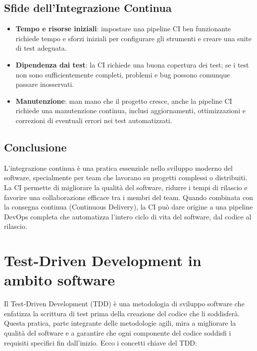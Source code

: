 \documentclass{article}
\begin{document}
\subsection*{Sfide dell'Integrazione Continua}
\begin{itemize}
    \item \textbf{Tempo e risorse iniziali}: impostare una pipeline CI ben funzionante richiede tempo e sforzi iniziali per configurare gli strumenti e creare una suite di test adeguata.
    \item \textbf{Dipendenza dai test}: la CI richiede una buona copertura dei test; se i test non sono sufficientemente completi, problemi e bug possono comunque passare inosservati.
    \item \textbf{Manutenzione}: man mano che il progetto cresce, anche la pipeline CI richiede una manutenzione continua, inclusi aggiornamenti, ottimizzazioni e correzioni di eventuali errori nei test automatizzati.
\end{itemize}

\subsection*{Conclusione}
L'integrazione continua è una pratica essenziale nello sviluppo moderno del software, specialmente per team che lavorano su progetti complessi o distribuiti. La CI permette di migliorare la qualità del software, ridurre i tempi di rilascio e favorire una collaborazione efficace tra i membri del team. Quando combinata con la consegna continua (Continuous Delivery), la CI può dare origine a una pipeline DevOps completa che automatizza l'intero ciclo di vita del software, dal codice al rilascio.

\section{Test-Driven Development in ambito software}

Il Test-Driven Development (TDD) è una metodologia di sviluppo software che enfatizza la scrittura di test prima della creazione del codice che li soddisferà. Questa pratica, parte integrante delle metodologie agili, mira a migliorare la qualità del software e a garantire che ogni componente del codice soddisfi i requisiti specifici fin dall'inizio. Ecco i concetti chiave del TDD:
\end{document}
